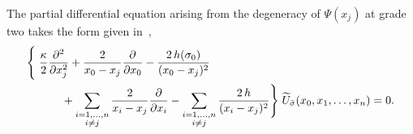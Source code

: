 \documentclass[oneside,english]{amsart}
\numberwithin{equation}{section}
\numberwithin{figure}{section}
\theoremstyle{plain}
\theoremstyle{plain}
\theoremstyle{plain}
\theoremstyle{remark}
\theoremstyle{plain}
\theoremstyle{plain}
\theoremstyle{plain}
\theoremstyle{plain}
\theoremstyle{plain}
\theoremstyle{plain}
\theoremstyle{plain}
\theoremstyle{plain}
\newcommand{\blue}[1]{{\color{blue} #1}}
\begin{document}
The %
partial differential equation
arising from the degeneracy of $\Psi(x_j)$ at grade two takes the form
given in~\cite{BPZ-infinite_conformal_symmetry_in_2D_QFT},
\begin{align}\label{eq: PDEs for conformal block functions}
\begin{split}
\Bigg\{ & \; \frac{\kappa}{2}\frac{\partial^{2}}{\partial x_{j}^{2}} + \frac{2}{x_{0}-x_{j}}\frac{\partial}{\partial x_{0}} - \frac{2\,h(\sigma_{0})}{(x_{0}-x_{j})^{2}} \quad 
	  \\
& \; \qquad + \sum_{\substack{i=1,\ldots,n \\ i\neq j}} \frac{2}{x_{i}-x_{j}}\frac{\partial}{\partial x_{i}}
- \sum_{\substack{i=1,\ldots,n\\i\neq j}} \frac{2\,h}{(x_{i}-x_{j})^{2}} \Bigg\} \; \widetilde{U}_{\bar{\sigma}}(x_{0},x_{1},\ldots,x_{n})
       = 0 . 
\end{split}
\end{align}
\end{document}
